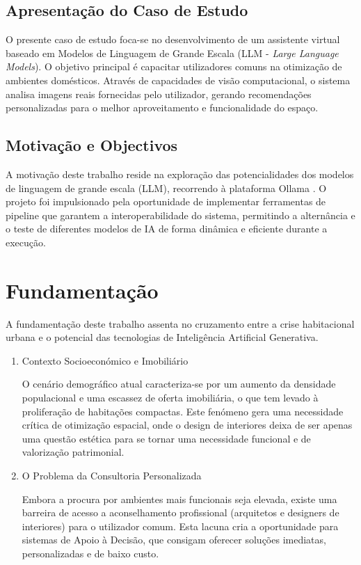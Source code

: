 \documentclass[a4paper,12pt]{scrreprt}
\begin{document}
    \section{Apresentação do Caso de Estudo}
        O presente caso de estudo foca-se no desenvolvimento de um assistente virtual baseado em Modelos de Linguagem de Grande Escala (LLM - \textit{Large Language Models}). O objetivo principal é capacitar utilizadores comuns na otimização de ambientes domésticos. Através de capacidades de visão computacional, o sistema analisa imagens reais fornecidas pelo utilizador, gerando recomendações personalizadas para o melhor aproveitamento e funcionalidade do espaço.
    \section{Motivação e Objectivos}
        A motivação deste trabalho reside na exploração das potencialidades dos modelos de linguagem de grande escala (LLM), recorrendo à plataforma Ollama \cite{ollama}. O projeto foi impulsionado pela oportunidade de implementar ferramentas de pipeline que garantem a interoperabilidade do sistema, permitindo a alternância e o teste de diferentes modelos de IA de forma dinâmica e eficiente durante a execução.



\chapter{Fundamentação}
    A fundamentação deste trabalho assenta no cruzamento entre a crise habitacional urbana e o potencial das tecnologias de Inteligência Artificial Generativa.

    \begin{enumerate}
        \item Contexto Socioeconómico e Imobiliário

        O cenário demográfico atual caracteriza-se por um aumento da densidade populacional e uma escassez de oferta imobiliária, o que tem levado à proliferação de habitações compactas. Este fenómeno gera uma necessidade crítica de otimização espacial, onde o design de interiores deixa de ser apenas uma questão estética para se tornar uma necessidade funcional e de valorização patrimonial.

        \item O Problema da Consultoria Personalizada

        Embora a procura por ambientes mais funcionais seja elevada, existe uma barreira de acesso a aconselhamento profissional (arquitetos e designers de interiores) para o utilizador comum. Esta lacuna cria a oportunidade para sistemas de Apoio à Decisão, que consigam oferecer soluções imediatas, personalizadas e de baixo custo.
    \end{enumerate}
\end{document}
